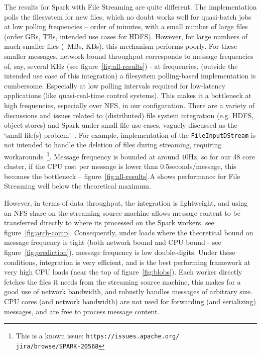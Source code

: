 \documentclass[conference]{IEEEtran}
\begin{document}
The results for Spark with File Streaming are quite different. The implementation polls the filesystem for new files, which no doubt works well for quasi-batch jobs at low polling frequencies -- order of minutes, with a small number of large files (order GBs, TBs, intended use cases for HDFS). However, for large numbers of much smaller files (~MBs, KBs), this mechanism performs poorly. For these smaller messages, network-bound throughput corresponds to message frequencies of, say, several KHz (see figure~\ref{fig:all-results}) - at frequencies, (outside the intended use case of this integration) a filesystem polling-based implementation is cumbersome. Especially at low polling intervals required for low-latency applications (like quasi-real-time control systems).  
This makes it a bottleneck at high frequencies, especially over NFS, in our configuration. There are a variety of discussions and issues related to (distributed) file system integration (e.g. HDFS, object stores) and Spark under small file use cases, vaguely discussed as the `small file(s) problem'~\cite{pointerThingsWeHate2015}.
For example, implementation of the \texttt{FileInputDStream} is not intended to handle the deletion of files during streaming, requiring workarounds~\footnote{This is a known issue: \texttt{https://issues.apache.org/\\jira/browse/SPARK-20568}}.
Message frequency is bounded at around 40Hz, so for our 48 core cluster, if the CPU cost per message is lower than 0.5seconds/message, this becomes the bottleneck -- figure~\ref{fig:all-results}.A shows performance for File Streaming well below the theoretical maximum. 

However, in terms of data throughput, the integration is lightweight, and using an NFS share on the streaming source machine allows message content to be transferred directly to where its processed on the Spark workers, see figure~\ref{fig:arch-comp}. Consequently, under loads where the theoretical bound on message frequency is tight (both network bound and CPU bound - see figure~\ref{fig:prediction}), message frequency is low double-digits. Under these conditions, integration is very efficient, and is the best performing framework at very high CPU loads (near the top of figure~\ref{fig:blobs}). Each worker directly fetches the files it needs from the streaming source machine, this makes for a good use of network bandwidth, and robustly handles messages of arbitrary size. CPU cores (and network bandwidth) are not used for forwarding (and serializing) messages, and are free to process message content.
\end{document}
